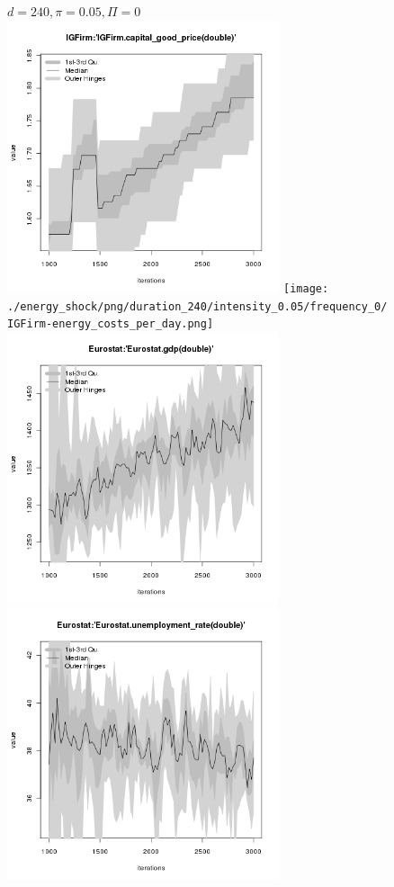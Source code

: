 \begin{figure}[ht!]
\centering\leavevmode
\begin{minipage}{17cm}
\centering\leavevmode
{$d=240, \pi=0.05, \Pi=0$}\\
\includegraphics[width=8cm]{./energy_shock/png/duration_240/intensity_0.05/frequency_0/IGFirm-capital_good_price.png}
\texttt{[image: ./energy\_shock/png/duration\_240/intensity\_0.05/frequency\_0/IGFirm-energy\_costs\_per\_day.png]}
\includegraphics[width=8cm]{./energy_shock/png/duration_240/intensity_0.05/frequency_0/Eurostat-gdp.png}
\includegraphics[width=8cm]{./energy_shock/png/duration_240/intensity_0.05/frequency_0/Eurostat-unemployment_rate.png}
\end{minipage}
\end{figure}

